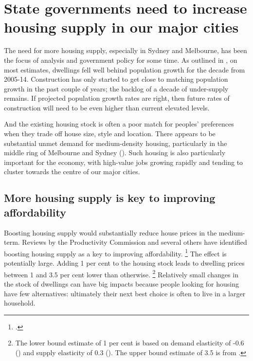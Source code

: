 \section{State governments need to increase housing supply in our major cities}\label{sec:state-governments-need-to-increase-housing-supply-in-our-major-cities}

The need for more housing supply, especially in Sydney and Melbourne, has been the focus of analysis and government policy for some time.
As outlined in , on most estimates, dwellings fell well behind population growth for the decade from 2005-14.
Construction has only started to get close to matching population growth in the past couple of years; the backlog of a decade of under-supply remains.
If projected population growth rates are right, then future rates of construction will need to be even higher than current elevated levels.

And the existing housing stock is often a poor match for peoples' preferences when they trade off house size, style and location.
There appears to be substantial unmet demand for medium-density housing, particularly in the middle ring of Melbourne and Sydney ().
Such housing is also particularly important for the economy, with high-value jobs growing rapidly and tending to cluster towards the centre of our major cities.

\subsection{More housing supply is key to improving affordability }\label{subsec:boosting-housing-supply-in-our-major-cities-is-key-to-improving-affordability}

Boosting housing supply would substantially reduce house prices in the medium-term.
Reviews by the Productivity Commission and several others have identified boosting housing supply as a key to improving affordability.%
	\footcites{ProductivityCommission2004FirstHomeOwnership}{RBA2014SubmissionAffordableHousingInquiry}{SenateEconomicsRefAffordableHousing2015}{Stevens-2017-Report-to-NSW-Premier-Housing-affordaibility}[][15]{IMF2018_ArticleIV}
The effect is potentially large. Adding 1 per cent to the housing stock leads to dwelling prices between 1 and 3.5 per cent lower than otherwise.%
	\footnote{The lower bound estimate of 1 per cent is based on demand elasticity of -0.6 (\textcites{Albouy-2016-housing-demand}{barkerinterim2003}) and supply elasticity of 0.3 ().
	The upper bound estimate of 3.5 is from \textcite{Abelsonetal2005}.}
Relatively small changes in the stock of dwellings can have big impacts because people looking for housing have few alternatives: ultimately their next best choice is often to live in a larger household.

